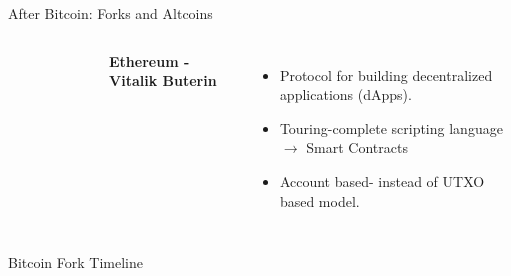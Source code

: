 \documentclass[]{beamer}
\begin{document}
\begin{frame}{After Bitcoin: Forks and Altcoins}
	\begin{columns}
		\begin{figure}
			\begin{tikzpicture}[scale=1]
				
			\end{tikzpicture}
		\end{figure}
		\textbf{Ethereum - Vitalik Buterin}
		\vspace{0.5em}
		\begin{itemize}
			\item Protocol for building decentralized applications (dApps).
			\item Touring-complete scripting language $\rightarrow$ Smart Contracts
			\item Account based- instead of UTXO based model.
		\end{itemize}
	\end{columns}	
\end{frame}


\begin{frame}{Bitcoin Fork Timeline}
	\begin{figure}[h!]
	\center
		\begin{tikzpicture}[scale=0.65, every node/.style={scale=0.65}]
			
  		\end{tikzpicture}
		\label{fig:forkhistory}
	\end{figure}
\end{frame}
\end{document}
